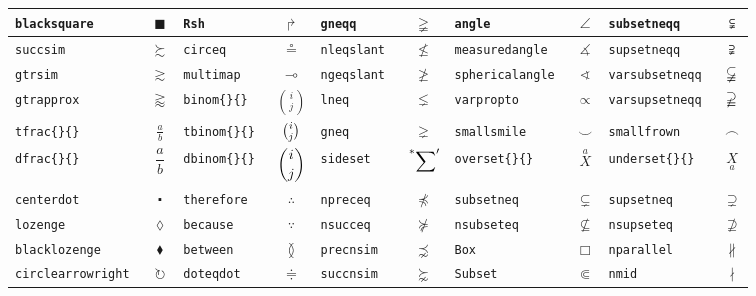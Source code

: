 \documentclass[10pt]{article}
\def\bs{\tt\char92}
\begin{document}
{\begin{tabular}{|l|c||l|c||l|c||l|c||l|c|}
     \bs blacksquare        &$\blacksquare        $ & \bs Rsh              &$\Rsh              $& \bs gneqq            &$\gneqq            $ &\bs angle             &$\angle             $& \bs subsetneqq      &$\subsetneqq      $\\   \hline
     \bs succsim            &$\succsim            $ & \bs circeq           &$\circeq           $& \bs nleqslant        &$\nleqslant        $ &\bs measuredangle     &$\measuredangle     $& \bs supsetneqq      &$\supsetneqq      $\\   \hline
     \bs gtrsim             &$\gtrsim             $ & \bs multimap         &$\multimap         $& \bs ngeqslant        &$\ngeqslant        $ &\bs sphericalangle    &$\sphericalangle    $& \bs varsubsetneqq   &$\varsubsetneqq   $\\   \hline
     \bs gtrapprox          &$\gtrapprox          $ & \bs binom\{\}\{\}    &$\binom{i}{j}      $& \bs lneq             &$\lneq             $ &\bs varpropto         &$\varpropto         $& \bs varsupsetneqq   &$\varsupsetneqq   $\\   \hline
     \bs tfrac\{\}\{\}      &$\tfrac{a}{b}        $ & \bs tbinom\{\}\{\}   &$\tbinom{i}{j}     $& \bs gneq             &$\gneq             $ &\bs smallsmile        &$\smallsmile        $& \bs smallfrown      &$\smallfrown      $\\   \hline
     \bs dfrac\{\}\{\}      &$\dfrac{a}{b}        $ & \bs dbinom\{\}\{\}   &$\dbinom{i}{j}     $& \bs sideset          &$\sideset{^*}{'}\sum$&\bs overset\{\}\{\}   &$\overset{a}{X}     $& \bs underset\{\}\{\}&$\underset{a}{X}  $\\   \hline
     \bs centerdot          &$\centerdot          $ & \bs therefore        &$\therefore        $& \bs npreceq          &$\npreceq          $ &\bs subsetneq         &$\subsetneq         $& \bs supsetneq       &$\supsetneq       $\\   \hline
     \bs lozenge            &$\lozenge            $ & \bs because          &$\because          $& \bs nsucceq          &$\nsucceq          $ &\bs nsubseteq         &$\nsubseteq         $& \bs nsupseteq       &$\nsupseteq       $\\   \hline
     \bs blacklozenge       &$\blacklozenge       $ & \bs between          &$\between          $& \bs precnsim         &$\precnsim         $ &\bs Box               &$\Box               $& \bs nparallel       &$\nparallel       $\\   \hline
     \bs circlearrowright   &$\circlearrowright   $ & \bs doteqdot         &$\doteqdot         $& \bs succnsim         &$\succnsim         $ &\bs Subset            &$\Subset            $& \bs nmid            &$\nmid            $\\   \hline

\end{tabular}}
\end{document}
